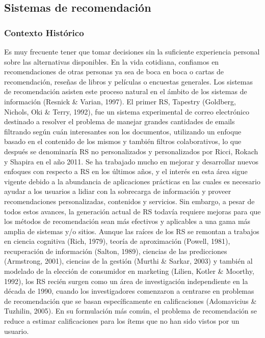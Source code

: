 \subsection{Sistemas de recomendación}
\subsubsection{Contexto Histórico}
Es muy frecuente tener que tomar decisiones sin la suficiente experiencia personal sobre las alternativas disponibles. En la vida cotidiana, confiamos en recomendaciones de otras personas ya sea de boca en boca o cartas de recomendación, reseñas de libros y películas o encuestas generales. Los sistemas de recomendación asisten este proceso natural en el ámbito de los sistemas de información (Resnick \& Varian, 1997). El primer RS, Tapestry (Goldberg, Nichols, Oki \& Terry, 1992), fue un sistema experimental de correo electrónico destinado a resolver el problema de manejar grandes cantidades de emails filtrando según cuán interesantes son los documentos, utilizando un enfoque basado en el contenido de los mismos y también filtros colaborativos, lo que después se denominaría RS no personalizados y personalizados por Ricci, Rokach y Shapira en el año 2011. Se ha trabajado mucho en mejorar y desarrollar nuevos enfoques con respecto a RS en los últimos años, y el interés en esta área sigue vigente debido a la abundancia de aplicaciones prácticas en las cuales es necesario ayudar a los usuarios a lidiar con la sobrecarga de información y proveer recomendaciones personalizadas, contenidos y servicios. Sin embargo, a pesar de todos estos avances, la generación actual de RS todavía requiere mejoras para que los métodos de recomendación sean más efectivos y aplicables a una gama más amplia de sistemas y/o sitios. Aunque las raíces de los RS se remontan a trabajos en ciencia cognitiva (Rich, 1979), teoría de aproximación (Powell, 1981), recuperación de información (Salton, 1989), ciencias de las predicciones (Armstrong, 2001), ciencias de la gestión (Murthi \& Sarkar, 2003) y también al modelado de la elección de consumidor en marketing (Lilien, Kotler \& Moorthy, 1992), los RS recién surgen como un área de investigación independiente en la década de 1990, cuando los investigadores comenzaron a centrarse en problemas de recomendación que se basan específicamente en calificaciones (Adomavicius \& Tuzhilin, 2005). En su formulación más común, el problema de recomendación se reduce a estimar calificaciones para los ítems que no han sido vistos por un usuario.


